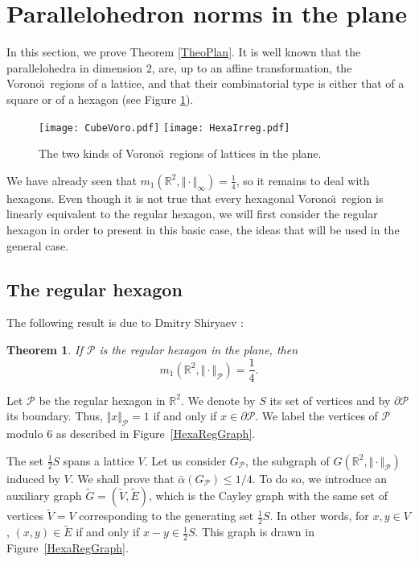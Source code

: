 \documentclass{amsart}                     %
\newtheorem{theo}{Theorem}
\newcommand{\R}{{\mathbb R}}
\newcommand{\fref}[1]{Figure~\textup{\ref{#1}}}
\begin{document}
\section{Parallelohedron norms in the plane} \label{Plane}

In this section, we prove Theorem \ref{TheoPlan}. 
It is well known that the  parallelohedra in dimension $2$, are, up  to an affine 
transformation, the Vorono\"\i\  regions of a lattice, and that their combinatorial type is either
that of a square or of a hexagon (see Figure \ref{Voro2}).

\begin{figure}[!ht]
\texttt{[image: CubeVoro.pdf]}
\hspace{20pt}
\texttt{[image: HexaIrreg.pdf]}
\caption{The two kinds of Vorono\"\i\  regions of lattices in the plane.\label{Voro2}}
\end{figure}

We have already seen that $m_1(\R^2,\Vert \cdot \Vert_\infty )= \frac{1}{4}$, so 
it remains to deal with hexagons. Even though it is not true that every hexagonal Vorono\"\i\  region is linearly equivalent to the regular hexagon, we will first consider the regular hexagon in order to present in this basic case, the ideas that will be used in the general case.



\subsection{The regular hexagon}\label{HexaRegDemi}

The following result is due to Dmitry Shiryaev \cite{Dmitry}:

\begin{theo}\label{HexaRegTheo}
If $\mathcal{P}$ is the regular hexagon in the plane, then
$$m_1(\R^2,\Vert   \cdot\Vert  _\mathcal{P})=\frac{1}{4}.$$
\end{theo}

Let $\mathcal{P}$ be the regular hexagon in $\R^2$. We denote by $S$ its set of vertices and by $\partial\mathcal{P}$ its boundary. Thus, $\Vert  x\Vert  _\mathcal{P}=1$ if and only if $x\in \partial\mathcal{P}$.
We label the vertices of $\mathcal{P}$ modulo 6 as described in \fref{HexaRegGraph}.

The set $\frac{1}{2}S$ spans a lattice $V$. Let us consider $G_\mathcal{P}$, the subgraph of $G(\R^2, \Vert \cdot \Vert_\mathcal{P})$ induced by $V$. We shall prove that $\bar{\alpha}(G_\mathcal{P})\leq 1/4$. To do so, we introduce an auxiliary graph $\tilde{G}=(\tilde{V},\tilde{E})$, which is the Cayley graph with the same set of vertices $\tilde{V}=V$ corresponding to the generating set $\frac{1}{2}S$. In other words, for $x,y\in V$, $(x,y)\in \tilde{E}$  if and only if $x-y\in \frac{1}{2}S$. This graph is drawn in \fref{HexaRegGraph}.
\end{document}
